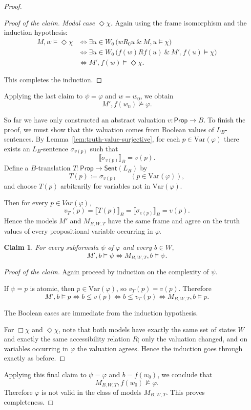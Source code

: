 \documentclass[11pt]{amsart}
\theoremstyle{definition}
\theoremstyle{plain}
\newtheorem{claim}[definition]{Claim}
\newcommand{\Prop}{\mathsf{Prop}}
\newcommand{\Sent}{\mathsf{Sent}}
\begin{document}
\begin{proof}
\begin{proof}[Proof of the claim]
\smallskip
\noindent\emph{Modal case $\Diamond\chi$.}
Again using the frame isomorphism and the induction hypothesis:
\begin{align*}
M,w\models\Diamond\chi
&\iff \exists u\in W_0\,\bigl(wR_0u \ \&\ M,u\models\chi\bigr)\\
&\iff \exists u\in W_0\,\bigl(f(w)Rf(u) \ \&\ M',f(u)\models\chi\bigr)\\
&\iff M',f(w)\models\Diamond\chi.
\end{align*}

This completes the induction.
\end{proof}

Applying the last claim to $\psi=\varphi$ and $w=w_0$, we obtain
\[
M',f(w_0)\not\models\varphi.
\]



So far we have only constructed an abstract valuation $v:\Prop\to B$.
To finish the proof, we must show that this valuation comes from Boolean values of
$L_B$-sentences.
By Lemma~\ref{lem:truth-value-surjective}, for each $p\in \mathrm{Var}(\varphi)$ there exists an
$L_B$-sentence $\sigma_{v(p)}$ such that
\[
\llbracket \sigma_{v(p)}\rrbracket_B=v(p).
\]
Define a $B$-translation $T:\Prop\to\Sent(L_B)$ by
\[
T(p):=\sigma_{v(p)} \qquad (p\in \mathrm{Var}(\varphi)),
\]
and choose $T(p)$ arbitrarily for variables not in $\mathrm{Var}(\varphi)$.

Then for every $p\in Var(\varphi)$,
\[
v_T(p)=\llbracket T(p)\rrbracket_B=\llbracket \sigma_{v(p)}\rrbracket_B=v(p).
\]
Hence the models $M'$ and $M_{B,W,T}$ have the same frame and agree on the truth values of every
propositional variable occurring in $\varphi$.

\begin{claim}
For every subformula $\psi$ of $\varphi$ and every $b\in W$,
\[
M',b\models\psi \iff M_{B,W,T},b\models\psi.
\]
\end{claim}

\begin{proof}[Proof of the claim]
Again proceed by induction on the complexity of $\psi$.

If $\psi=p$ is atomic, then $p\in \mathrm{Var}(\varphi)$, so $v_T(p)=v(p)$. Therefore
\[
M',b\models p
\iff b\leq v(p)
\iff b\leq v_T(p)
\iff M_{B,W,T},b\models p.
\]

The Boolean cases are immediate from the induction hypothesis.

For $\Box\chi$ and $\Diamond\chi$, note that both models have exactly the same set of states $W$
and exactly the same accessibility relation $R$; only the valuation changed, and on variables
occurring in $\varphi$ the valuation agrees. Hence the induction goes through exactly as before.
\end{proof}

Applying this final claim to $\psi=\varphi$ and $b=f(w_0)$, we conclude that
\[
M_{B,W,T},f(w_0)\not\models\varphi.
\]
Therefore $\varphi$ is not valid in the class of models $M_{B,W,T}$.
This proves completeness.
\end{proof}
\end{document}
